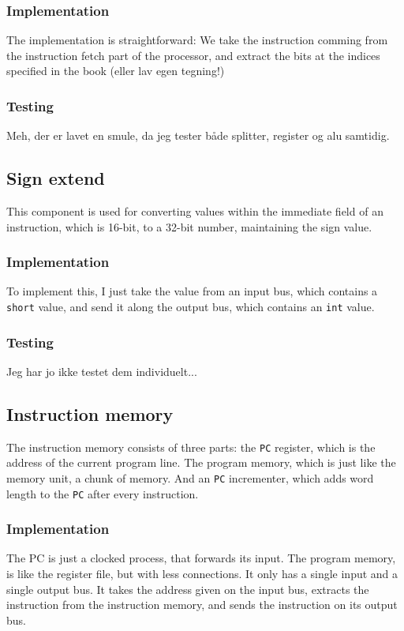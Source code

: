 \subsubsection*{Implementation}
The implementation is straightforward: We take the instruction comming from the
instruction fetch part of the processor, and extract the bits at the indices
specified in the book (eller lav egen tegning!)

\subsubsection*{Testing}
Meh, der er lavet en smule, da jeg tester både splitter, register og alu
samtidig.

\subsection{Sign extend}
This component is used for converting values within the immediate field of an
instruction, which is 16-bit, to a 32-bit number, maintaining the sign value.

\subsubsection*{Implementation}
To implement this, I just take the value from an input bus, which contains a
\texttt{short} value, and send it along the output bus, which contains an
\texttt{int} value.

\subsubsection*{Testing}
Jeg har jo ikke testet dem individuelt...

\subsection{Instruction memory}
The instruction memory consists of three parts: the \texttt{PC} register, which
is the address of the current program line. The program memory, which is just
like the memory unit, a chunk of memory. And an \texttt{PC} incrementer, which
adds word length to the \texttt{PC} after every instruction.

\subsubsection*{Implementation}
The PC is just a clocked process, that forwards its input. The program memory,
is like the register file, but with less connections. It only has a single
input and a single output bus. It takes the address given on the input bus,
extracts the instruction from the instruction memory, and sends the instruction
on its output bus.

